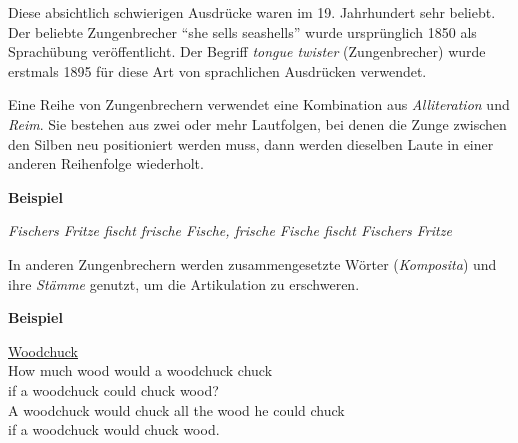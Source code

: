 \documentclass[
  letterpaper,
]{scrbook}
\begin{document}
Diese absichtlich schwierigen Ausdrücke waren im 19. Jahrhundert sehr
beliebt. Der beliebte Zungenbrecher ``she sells seashells'' wurde
ursprünglich 1850 als Sprachübung veröffentlicht. Der Begriff
\emph{tongue twister} (Zungenbrecher) wurde erstmals 1895 für diese Art
von sprachlichen Ausdrücken verwendet.

Eine Reihe von Zungenbrechern verwendet eine Kombination aus
\emph{Alliteration} und \emph{Reim}. Sie bestehen aus zwei oder mehr
Lautfolgen, bei denen die Zunge zwischen den Silben neu positioniert
werden muss, dann werden dieselben Laute in einer anderen Reihenfolge
wiederholt.

\begin{tcolorbox}[enhanced jigsaw, opacityback=0, colback=white, breakable, toprule=.15mm, rightrule=.15mm, bottomrule=.15mm, colframe=quarto-callout-note-color-frame, arc=.35mm, leftrule=.75mm, left=2mm]
\begin{minipage}[t]{5.5mm}
\textcolor{quarto-callout-note-color}{\faInfo}
\end{minipage}%
\begin{minipage}[t]{\textwidth - 5.5mm}

\textbf{Beispiel}\vspace{2mm}

\emph{Fischers Fritze fischt frische Fische, frische Fische fischt
Fischers Fritze}

\end{minipage}%
\end{tcolorbox}

In anderen Zungenbrechern werden zusammengesetzte Wörter
(\emph{Komposita}) und ihre \emph{Stämme} genutzt, um die Artikulation
zu erschweren.

\begin{tcolorbox}[enhanced jigsaw, opacityback=0, colback=white, breakable, toprule=.15mm, rightrule=.15mm, bottomrule=.15mm, colframe=quarto-callout-note-color-frame, arc=.35mm, leftrule=.75mm, left=2mm]
\begin{minipage}[t]{5.5mm}
\textcolor{quarto-callout-note-color}{\faInfo}
\end{minipage}%
\begin{minipage}[t]{\textwidth - 5.5mm}

\textbf{Beispiel}\vspace{2mm}

\href{https://en.wikipedia.org/wiki/How_much_wood_would_a_woodchuck_chuck}{Woodchuck}\\
How much wood would a woodchuck chuck\\
if a woodchuck could chuck wood?\\
A woodchuck would chuck all the wood he could chuck\\
if a woodchuck would chuck wood.\\

\end{minipage}%
\end{tcolorbox}
\end{document}
